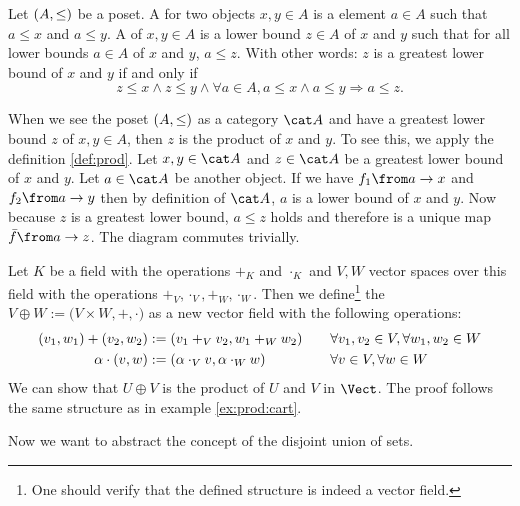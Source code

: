 \begin{example}[Posets]
  \label{ex:prod:poset}
  Let $\left( A , \le \right)$ be a poset.
  A  for two objects $x, y \in A$ is a element $a \in A$ such that $a \le x$ and $a \le y$.
  A  of $x, y \in A$ is a lower bound $z \in A$ of $x$ and $y$ such that for all lower bounds $a \in A$ of $x$ and $y$, $a \le z$.
  With other words: $z$ is a greatest lower bound of $x$ and $y$ if and only if
  $$z \le x \land z \le y \land \forall a \in A, a \le x \land a \le y \Rightarrow a \le z.$$

  When we see the poset $\left( A , \le \right)$ as a category $\catA$ and have a greatest lower bound $z$ of $x, y \in A$, then $z$ is the product of $x$ and $y$.
  To see this, we apply the definition \ref{def:prod}.
  Let $x, y \in \catA$ and $z \in \catA$ be a greatest lower bound of $x$ and $y$.
  Let $a \in \catA$ be another object.
  If we have $f_1 \from a \to x$ and $f_2 \from a \to y$ then by definition of $\catA$, $a$ is a lower bound of $x$ and $y$.
  Now because $z$ is a greatest lower bound, $a \le z$ holds and therefore is a unique map $\fbar \from a \to z$.
  The diagram commutes trivially.
\end{example}

\begin{example}
  \label{ex:prod:vspace}
  Let $K$ be a field with the operations $+_K$ and $\cdot_K$ and $V, W$ vector spaces over this field with the operations $+_V, \cdot_V, +_W, \cdot_W$.
  Then we define\footnote{One should verify that the defined structure is indeed a vector field.}
  the  $V \oplus W := \bigl(V \times W, +, \cdot \bigr)$ as a new vector field with the following operations:
  \begin{alignat*}{4}
    \left( v_1 , w_1 \right) + \left( v_2 , w_2 \right) &:= \left( v_1 +_V v_2 , w_1 +_W w_2 \right)           &\quad& \forall v_1, v_2 \in V, \forall w_1, w_2 \in W \\
    \alpha \cdot \left( v , w \right)          &:= \left( \alpha \cdot_V v , \alpha \cdot_W w \right) &     & \forall v \in V, \forall w \in W
  \end{alignat*}
  We can show that $U \oplus V$ is the product of $U$ and $V$ in $\Vect$.
  The proof follows the same structure as in example \ref{ex:prod:cart}.
\end{example}

Now we want to abstract the concept of the disjoint union of sets.

